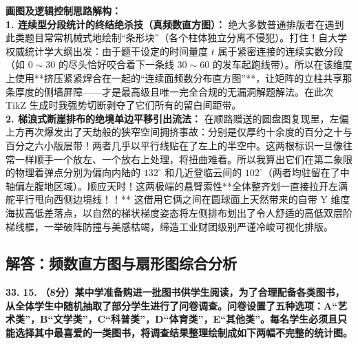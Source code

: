 {\small\color{blue!70!black}
\textbf{画图及逻辑控制思路解构：}\\
\textbf{1. 连续型分段统计的终结绝杀技（真频数直方图）：} 绝大多数普通排版者在遇到此类题目常常机械式地绘制“条形块”（各个柱体独立分离不侵犯）。打住！自大学权威统计学大纲出发：由于题干设定的时间量度 $t$ 属于紧密连接的连续实数分段（如 $0{\sim}30$ 的尽头恰好咬合着下一条线 $30{\sim}60$ 的发车起跑线带）。所以在该维度上使用**挤压紧紧焊合在一起的“连续面频数分布直方图”**，让矩阵的立柱共享那条厚度的侧墙屏障——才是最高级且唯一完全合规的无漏洞解题解法。在此次 TikZ 生成时我强势切断剥夺了它们所有的留白间距带。\\
\textbf{2. 梯浪式断崖排布的绝境单边平移引出流法：} 在顺路赠送的圆盘图复现里，左偏上方再次爆发出了天劫般的狭窄空间拥挤事故：分别是仅厚约十余度的百分之十与百分之六小版层带！两者几乎以平行线贴在了左上的半空中。这两根标识一旦像往常一样顺手一个放左、一个放右上处理，将扭曲难看。所以我算出它们在第二象限的物理着弹点分别为偏向内陆的 $132^\circ$ 和几近登临云间的 $102^\circ$（两者均驻留在了中轴偏左腹地区域）。顺应天时！这两极端的悬臂索性**全体整齐划一直接拉开左满舵平行甩向西侧边境线！！** 这借用它俩之间在圆球面上天然带来的自带 Y 维度海拔高低差落点，以自然的梯状梯度姿态将左侧排布划出了令人舒适的高低双层阶梯线框，一举破阵防撞与美感枯竭，缔造工业财团级别严谨冷峻可视化排版。
}



\newpage

\newpage

\subsection{解答：频数直方图与扇形图综合分析}

\vspace{0.6cm}

\textbf{\LARGE 33.} \textbf{\color{cyan!80!blue} 15. }\textbf{（8分）某中学准备购进一批图书供学生阅读，为了合理配备各类图书，从全体学生中随机抽取了部分学生进行了问卷调查。问卷设置了五种选项：A“艺术类”，B“文学类”，C“科普类”，D“体育类”，E“其他类”。每名学生必须且只能选择其中最喜爱的一类图书，将调查结果整理绘制成如下两幅不完整的统计图。}

